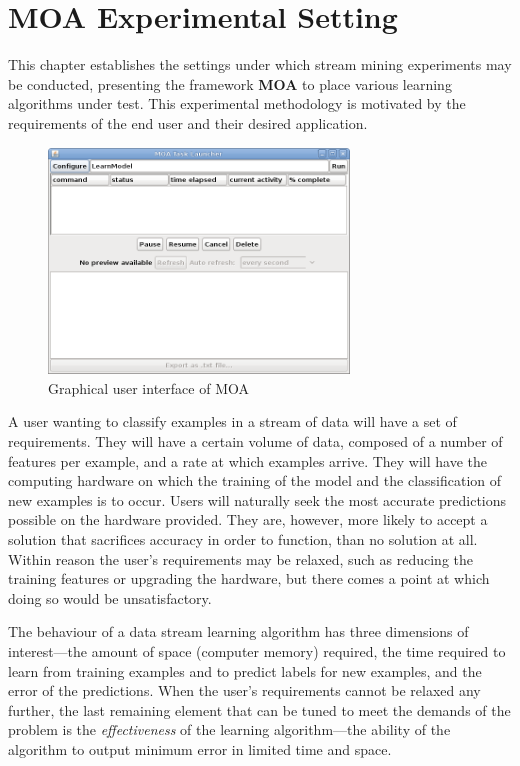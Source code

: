 \chapter{MOA Experimental Setting}
\label{chap:experimentalsetting} 

This chapter establishes the settings under which stream mining experiments may be conducted, presenting the framework \textbf{MOA} %
 to place various learning algorithms under test.
This experimental methodology %
is motivated by the requirements of the end user and their desired application.

\begin{figure}[ht]
\begin{center}
\includegraphics[height=6cm]{figures/MOATask.png}\end{center}
\caption{Graphical user interface of MOA}
\end{figure}

A user wanting to classify examples in a stream of data will have a set of requirements. They will have a certain volume of data, composed of a number of features per example, and a rate at which examples arrive. They will have the computing hardware on which the training of the model and the classification of new examples is to occur.
Users will naturally seek the most accurate predictions possible on the hardware provided. They are, however, more likely to accept a solution that sacrifices accuracy in order to function, than no solution at all. Within reason the user's requirements may be relaxed, such as reducing the training features or upgrading the hardware, but there comes a point at which doing so would be unsatisfactory.

The behaviour of a data stream learning algorithm has three dimensions of interest---the amount of space (computer memory) required, the time required to learn from training examples and to predict labels for new examples, and the error of the predictions.
When the user's requirements cannot be relaxed any further, the last remaining element that can be tuned to meet the demands of the problem is the {\em effectiveness} of the learning algorithm---the ability of the algorithm to output minimum error in limited time and space.

